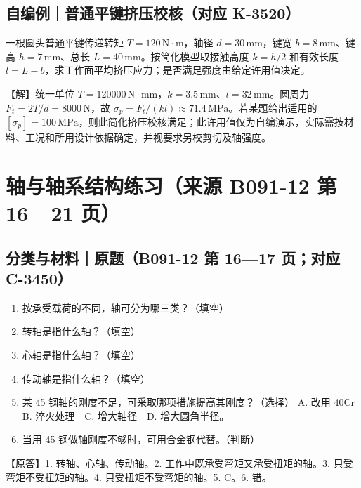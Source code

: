\documentclass[zihao=5,a4paper,UTF8,fontset=fandol]{ctexart}
\begin{document}
\subsection{自编例｜普通平键挤压校核（对应 K-3520）}

一根圆头普通平键传递转矩 $T=120\,\mathrm{N\cdot m}$，轴径 $d=30\,\mathrm{mm}$，键宽 $b=8\,\mathrm{mm}$、键高 $h=7\,\mathrm{mm}$、总长 $L=40\,\mathrm{mm}$。按简化模型取接触高度 $k=h/2$ 和有效长度 $l=L-b$，求工作面平均挤压应力；是否满足强度由给定许用值决定。


【解】统一单位 $T=120000\,\mathrm{N\cdot mm}$，$k=3.5\,\mathrm{mm}$、$l=32\,\mathrm{mm}$。圆周力 $F_t=2T/d=8000\,\mathrm{N}$，故 $\sigma_p=F_t/(kl)\approx71.4\,\mathrm{MPa}$。若某题给出适用的 $[\sigma_p]=100\,\mathrm{MPa}$，则此简化挤压校核满足；此许用值仅为自编演示，实际需按材料、工况和所用设计依据确定，并视要求另校剪切及轴强度。




\section{轴与轴系结构练习（来源 B091-12 第 16—21 页）}

\subsection{分类与材料｜原题（B091-12 第 16—17 页；对应 C-3450）}

\begin{enumerate}
\item 
按承受载荷的不同，轴可分为哪三类？（填空）


\item 
转轴是指什么轴？（填空）


\item 
心轴是指什么轴？（填空）


\item 
传动轴是指什么轴？（填空）


\item 
某 45 钢轴的刚度不足，可采取哪项措施提高其刚度？（选择）
A. 改用 40Cr　B. 淬火处理　C. 增大轴径　D. 增大圆角半径。


\item 
当用 45 钢做轴刚度不够时，可用合金钢代替。（判断）



\end{enumerate}

【原答】1. 转轴、心轴、传动轴。2. 工作中既承受弯矩又承受扭矩的轴。3. 只受弯矩不受扭矩的轴。4. 只受扭矩不受弯矩的轴。5. C。6. 错。
\end{document}
